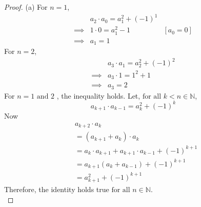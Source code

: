 \documentclass[12pt]{article}
\begin{document}
\begin{proof}
	(a) For $n = 1$,
	\begin{align*}
		         & a_2\cdot a_0 = a_1^2 + (-1)^1             \\
		\implies & 1\cdot 0 = a_1^2 - 1          & [a_0 = 0] \\
		\implies & a_1 = 1
	\end{align*}
	For $n = 2$,
	\begin{align*}
		         & a_3\cdot a_1 = a_2^2 + (-1)^2 \\
		\implies & a_3 \cdot 1 = 1^2 + 1         \\
		\implies & a_3 = 2
	\end{align*}
	For $n = 1 \text{ and } 2$ , the inequality holds. Let, $\text{for all } k < n \in \mathbb{N}$,
	\[
		a_{k+1}\cdot a_{k-1} = a_k^2 + (-1)^k
	\]
	Now
	\begin{align*}
		 & a_{k+2}\cdot a_k                                        \\
		 & = (a_{k+1} + a_k) \cdot a_k                             \\
		 & = a_k \cdot a_{k+1} + a_{k+1}\cdot a_{k-1} + (-1)^{k+1} \\
		 & = a_{k+1}(a_k + a_{k-1}) + (-1)^{k+1}                   \\
		 & = a_{k+1}^2 + (-1)^{k+1}
	\end{align*}
	Therefore, the identity holds true $\text{for all } n \in \mathbb{N}$.\\


\end{proof}
\end{document}
